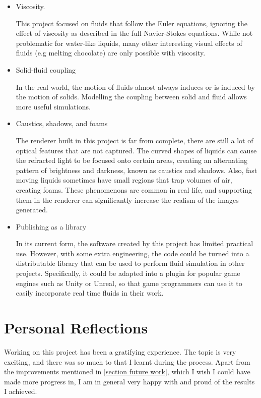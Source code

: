 \begin{itemize}
    \item Viscosity.
    
    This project focused on fluids that follow the Euler equations, ignoring the effect of viscosity as described in the full Navier-Stokes equations. While not problematic for water-like liquids, many other interesting visual effects of fluids (e.g melting chocolate) are only possible with viscosity. 
    

    \item Solid-fluid coupling
    
    In the real world, the motion of fluids almost always induces or is induced by the motion of solids. Modelling the coupling between solid and fluid allows more useful simulations. 

    \item Caustics, shadows, and foams
    
    The renderer built in this project is far from complete, there are still a lot of optical features that are not captured. The curved shapes of liquids can cause the refracted light to be focused onto certain areas, creating an alternating pattern of brightness and darkness, known as caustics and shadows. Also, fast moving liquids sometimes have small regions that trap volumes of air, creating foams. These phenomenons are common in real life, and supporting them in the renderer can significantly increase the realism of the images generated.


    \item Publishing as a library
    
    In its current form, the software created by this project has limited practical use. However, with some extra engineering, the code could be turned into a distributable library that can be used to perform fluid simulation in other projects. Specifically, it could be adapted into a plugin for popular game engines such as Unity or Unreal, so that game programmers can use it to easily incorporate real time fluids in their work. 
    
\end{itemize}

\section{Personal Reflections}
Working on this project has been a gratifying experience. The topic is very exciting, and there was so much to that I learnt during the process. Apart from the improvements mentioned in \ref{section future work}, which I wish I could have made more progress in, I am in general very happy with and proud of the results I achieved.

